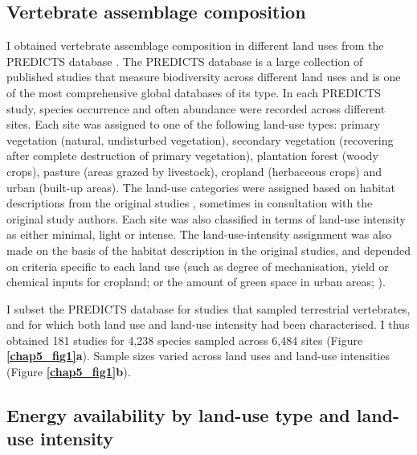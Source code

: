 \subsection{Vertebrate assemblage composition }

I obtained vertebrate assemblage composition in different land uses from the PREDICTS database \citep{Hudson2014, Hudson2017}. The PREDICTS database is a large collection of published studies that measure biodiversity across different land uses and is one of the most comprehensive global databases of its type. In each PREDICTS study, species occurrence and often abundance were recorded across different sites. Each site was assigned to one of the following land-use types: primary vegetation (natural, undisturbed vegetation), secondary vegetation (recovering after complete destruction of primary vegetation), plantation forest (woody crops), pasture (areas grazed by livestock), cropland (herbaceous crops) and urban (built-up areas). The land-use categories were assigned based on habitat descriptions from the original studies \citep{Hudson2014}, sometimes in consultation with the original study authors. Each site was also classified in terms of land-use intensity as either minimal, light or intense. The land-use-intensity assignment was also made on the basis of the habitat description in the original studies, and depended on criteria specific to each land use (such as degree of mechanisation, yield or chemical inputs for cropland; or the amount of green space in urban areas; \citet{Hudson2014}).  

I subset the PREDICTS database for studies that sampled terrestrial vertebrates, and for which both land use and land-use intensity had been characterised. I thus obtained 181 studies for 4,238 species sampled across 6,484 sites (Figure \textbf{\ref{chap5_fig1}a}). Sample sizes varied across land uses and land-use intensities (Figure \textbf{\ref{chap5_fig1}b}). 

\subsection{Energy availability by land-use type and land-use intensity}

